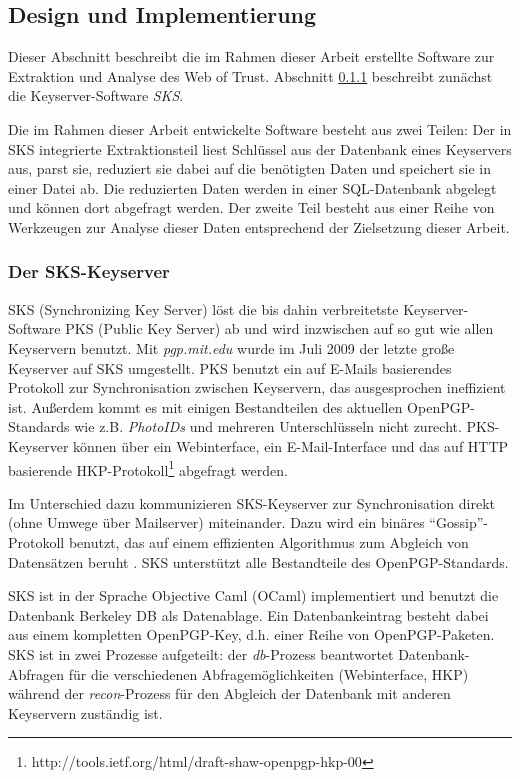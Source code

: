 \subsection{Design und Implementierung}
\label{ch:Grundlagen:sec:Design}

Dieser Abschnitt beschreibt die im Rahmen dieser Arbeit erstellte
Software zur Extraktion und Analyse des Web of Trust. Abschnitt
\ref{ch:Grundlagen:sec:Design:subsec:der-sks-keyserver} beschreibt
zunächst die Keyserver-Software \emph{SKS}.

Die im Rahmen dieser Arbeit entwickelte Software besteht aus zwei
Teilen: Der in SKS integrierte Extraktionsteil liest Schlüssel aus
der Datenbank eines Keyservers aus, parst sie, reduziert sie dabei auf
die benötigten Daten und speichert sie in einer Datei ab. Die
reduzierten Daten werden in einer SQL-Datenbank abgelegt und können
dort abgefragt werden. Der zweite Teil besteht aus einer Reihe von
Werkzeugen zur Analyse dieser Daten entsprechend der Zielsetzung
dieser Arbeit.

\subsubsection{Der SKS-Keyserver}
\label{ch:Grundlagen:sec:Design:subsec:der-sks-keyserver}

SKS (Synchronizing Key Server) löst die bis dahin verbreitetste
Keyserver-Software PKS (Public Key Server) ab und wird inzwischen auf
so gut wie allen Keyservern benutzt. Mit \emph{pgp.mit.edu} wurde im
Juli 2009 der letzte große Keyserver auf SKS umgestellt. PKS benutzt
ein auf E-Mails basierendes Protokoll zur Synchronisation zwischen
Keyservern, das ausgesprochen ineffizient ist. Außerdem kommt es mit
einigen Bestandteilen des aktuellen OpenPGP-Standards wie
z.B. \emph{PhotoIDs} und mehreren Unterschlüsseln nicht
zurecht. PKS-Keyserver können über ein Webinterface, ein
E-Mail-Interface und das auf HTTP basierende
HKP-Protokoll\footnote{http://tools.ietf.org/html/draft-shaw-openpgp-hkp-00}
abgefragt werden.

Im Unterschied dazu kommunizieren SKS-Keyserver zur Synchronisation
direkt (ohne Umwege über Mailserver) miteinander.  Dazu wird ein
binäres "`Gossip"'-Protokoll benutzt, das auf einem effizienten
Algorithmus zum Abgleich von Datensätzen beruht
\cite{Minsky2003}. SKS unterstützt alle Bestandteile des
OpenPGP-Standards.

SKS ist in der Sprache Objective Caml (OCaml) implementiert und
benutzt die Datenbank Berkeley DB als Datenablage. Ein
Datenbankeintrag besteht dabei aus einem kompletten OpenPGP-Key,
d.h. einer Reihe von OpenPGP-Paketen. SKS ist in zwei Prozesse
aufgeteilt: der \emph{db}-Prozess beantwortet Datenbank-Abfragen für
die verschiedenen Abfragemöglichkeiten (Webinterface, HKP) während der
\emph{recon}-Prozess für den Abgleich der Datenbank mit anderen
Keyservern zuständig ist.

